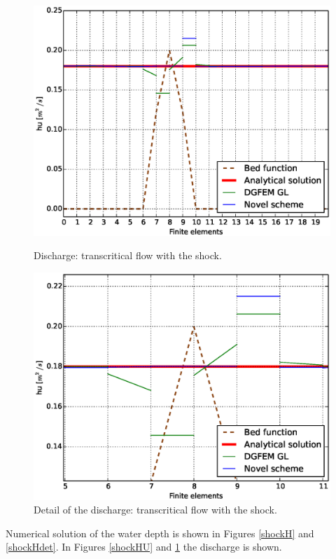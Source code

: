 								\begin{figure}[!ht]
								\centering
								 \begin{minipage}[t]{0.44\textwidth}
								    \begin{center}
								    \includegraphics[width=1.0\textwidth]{OBR/bump/shockHU.eps}
								    \caption{Discharge: transcritical flow with the shock.}
								    \label{shockHU}
								    \end{center}
								\end{minipage}\hspace{15mm}
								\begin{minipage}[t]{0.44\textwidth}
								    \begin{center}
								    \includegraphics[width=1.0\textwidth]{OBR/bump/shockHUdet.eps}
								    \caption{Detail of the discharge: transcritical flow with the shock.}
								    \label{shockHUdet}
								    \end{center}
								\end{minipage}
				\end{figure}
Numerical solution of the water depth is shown in Figures \ref{shockH} and \ref{shockHdet}. In Figures \ref{shockHU} and \ref{shockHUdet} the discharge is shown.